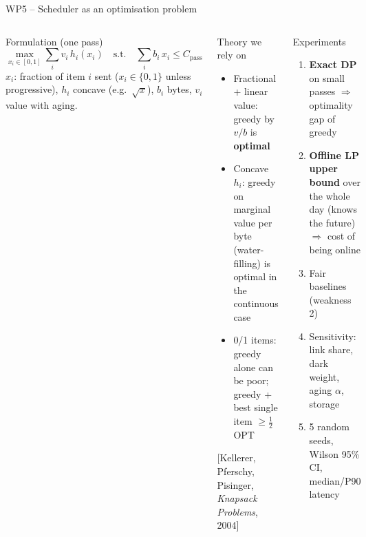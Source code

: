 \documentclass[aspectratio=169,10pt]{beamer}
\newcommand{\src}[1]{{\scriptsize\color{muted}[#1]}}
\begin{document}
\begin{frame}{WP5 -- Scheduler as an optimisation problem}
\begin{columns}[T]
\begin{block}{Formulation (one pass)}
\footnotesize
\[ \max_{x_i\in[0,1]} \sum_i v_i\, h_i(x_i) \quad \text{s.t.} \quad \sum_i b_i\, x_i \leq C_{\text{pass}} \]
$x_i$: fraction of item $i$ sent ($x_i\in\{0,1\}$ unless progressive), $h_i$ concave (e.g.\ $\sqrt{x}$), $b_i$ bytes, $v_i$ value with aging.
\end{block}
\begin{block}{Theory we rely on}
\footnotesize
\begin{itemize}
  \item Fractional + linear value: greedy by $v/b$ is \textbf{optimal}
  \item Concave $h_i$: greedy on marginal value per byte (water-filling) is optimal in the continuous case
  \item 0/1 items: greedy alone can be poor; greedy + best single item $\geq \tfrac12$ OPT
\end{itemize}
\src{Kellerer, Pferschy, Pisinger, \emph{Knapsack Problems}, 2004}
\end{block}
\begin{block}{Experiments}
\footnotesize
\begin{enumerate}
  \item \textbf{Exact DP} on small passes $\Rightarrow$ optimality gap of greedy
  \item \textbf{Offline LP upper bound} over the whole day (knows the future) $\Rightarrow$ cost of being online
  \item Fair baselines (weakness 2)
  \item Sensitivity: link share, dark weight, aging $\alpha$, storage
  \item 5 random seeds, Wilson 95\% CI, median/P90 latency
\end{enumerate}
\end{block}
\end{columns}
\end{frame}
\end{document}
